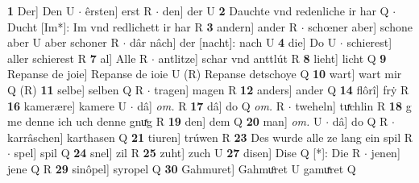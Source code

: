 \documentclass[8pt,a4paper,notitlepage]{article}
\begin{document}
\begin{table}[ht]
\begin{minipage}[t]{0.5\linewidth}
\textbf{1} Der] Den U  $\cdot$ êrsten] erst R  $\cdot$ den] der U \textbf{2} Dauchte vnd redenliche ir har Q  $\cdot$ Ducht [Im*]: Im vnd redlichett ir har R \textbf{3} andern] ander R  $\cdot$ schœner aber] schone aber U aber schoner R  $\cdot$ dâr nâch] der [nacht]: nach U \textbf{4} die] Do U  $\cdot$ schierest] aller schierest R \textbf{7} al] Alle R  $\cdot$ antlitze] schar vnd anttlút R \textbf{8} lieht] licht Q \textbf{9} Repanse de joie] Repanse de ioie U (R) Repanse detschoye Q \textbf{10} wart] wart mir Q (R) \textbf{11} selbe] selben Q R  $\cdot$ tragen] magen R \textbf{12} anders] ander Q \textbf{14} flôrî] frẏ R \textbf{16} kamerære] kamere U  $\cdot$ dâ] \textit{om.} R \textbf{17} dâ] do Q \textit{om.} R  $\cdot$ tweheln] tuͯchlin R \textbf{18} g me denne ich uch denne gnuͯg R \textbf{19} den] dem Q \textbf{20} man] \textit{om.} U  $\cdot$ dâ] do Q R  $\cdot$ karrâschen] karthasen Q \textbf{21} tiuren] trúwen R \textbf{23} Des wurde alle ze lang ein spil R  $\cdot$ spel] spil Q \textbf{24} snel] zil R \textbf{25} zuht] zuch U \textbf{27} disen] Dise Q [*]: Die R  $\cdot$ jenen] jene Q R \textbf{29} sinôpel] syropel Q \textbf{30} Gahmuret] Gahmuͦret U gamuͯret Q \newline
\end{minipage}
\end{table}
\end{document}
